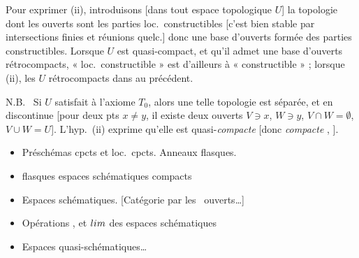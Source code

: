 \documentclass[11pt,a4paper]{article}
\begin{document}
Pour exprimer (ii), introduisons [dans tout espace topologique $U$] la topologie dont les ouverts sont les  parties loc.\ constructibles [c'est bien stable par intersections finies et réunions quelc.] donc une base d'ouverts formée des parties constructibles. Lorsque $U$ est quasi-compact, et qu'il admet une base d'ouverts rétrocompacts, « loc.\ constructible » est d'ailleurs  à « constructible » ; lorsque (ii), les $U$ rétrocompacts dans \ill{}  \ill{} \ill{} \ill{} au précédent.

N.B.\ \add{\ill{}} Si $U$ \ill{} satisfait  \struck{\ill{}} à l'axiome $T_0$, alors une telle topologie est séparée, \struck{\ill{}}
et en  discontinue [pour deux pts $x\neq y$, il existe deux ouverts $V\ni x$, $W\ni y$, $V\cap W=\emptyset$, $V\cup W=U$].
L'hyp.\ (ii) exprime qu'elle est quasi-\emph{compacte} [donc \struck{\ill{}} \emph{compacte} \ill{} \ill{} \ill{} \ill{}, ].

\begin{itemize}
\item[\textbf{N° 1}] Préschémas cpcts et loc.\ cpcts. Anneaux flasques.
\item[\textbf{N° 2}]   flasques  \struck{\ill{} \ill{}} espaces schématiques compacts
\item[\textbf{N° 3}]   Espaces schématiques. [Catégorie  par les \ ouverts\ldots]
\item[\textbf{N° 4}] Opérations , \struck{\ill{}} et $\varprojlim$ \struck{\ill{}} des espaces schématiques 
\item[\textbf{N° 5}] \struck{\ill{}} Espaces quasi-schématiques\ldots
\end{itemize}

\end{document}
